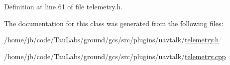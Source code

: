 \-Definition at line 61 of file telemetry.\-h.



\-The documentation for this class was generated from the following files\-:\begin{DoxyCompactItemize}
\item 
/home/jb/code/\-Tau\-Labs/ground/gcs/src/plugins/uavtalk/\hyperlink{telemetry_8h}{telemetry.\-h}\item 
/home/jb/code/\-Tau\-Labs/ground/gcs/src/plugins/uavtalk/\hyperlink{telemetry_8cpp}{telemetry.\-cpp}\end{DoxyCompactItemize}
